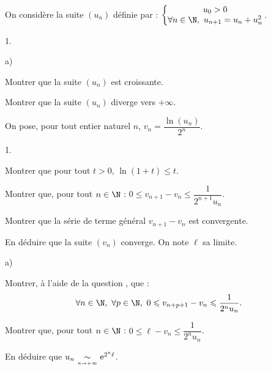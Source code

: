 \documentclass[11pt]{article}%
\begin{document}
\begin{exercice}~\\
On considère la suite $(u_n)$ définie par : $ \left\{ \begin{matrix}
u_0 >0\\
\forall n \in \N, \ u_{n+1} = u_n + u_n^2
\end{matrix} \right.$.
\begin{noliste}{1.}
\item \begin{noliste}{a)}
	\item Montrer que la suite $(u_n)$ est croissante.
	\item Montrer que la suite $(u_n)$ diverge vers $+ \infty$.
	\end{noliste}

\item On pose, pour tout entier naturel $n$, $ v_n = 
\dfrac{\ln(u_n)}{2^n}$.
	\begin{noliste}{1.}
	\item Montrer que pour tout $t>0$, $\ln(1+t) \leq t$.
	\item Montrer que, pour tout $n \in \N$ : $ 0 \leq v_{n+1} - 
v_n \leq \dfrac{1}{2^{n+1}u_n}$.
	\item Montrer que la série de terme général $v_{n+1} - v_n$ est 
convergente.
	\item En déduire que la suite $(v_n)$ converge. On note $\ell$ 
sa limite.
	\end{noliste}

\item \begin{noliste}{a)}
	\item Montrer, à l'aide de la question , que :
	\[
	\forall n \in \N, \ \forall p \in \N, \ 0 \leq v_{n+p+1} - v_n 
\leq \dfrac{1}{2^nu_n}.
	\]
	\item Montrer que, pour tout $n \in \N$ : $ 0 \leq \ell - 
v_n \leq \dfrac{1}{2^n u_n}$.
	\item En déduire que $ u_n {\ \underset {{\overset {n \to +\infty}{}}}{\sim}\ } 
\text{e}^{2^n \ell}$.
	\end{noliste}
\end{noliste}
\end{exercice}
\end{document}
